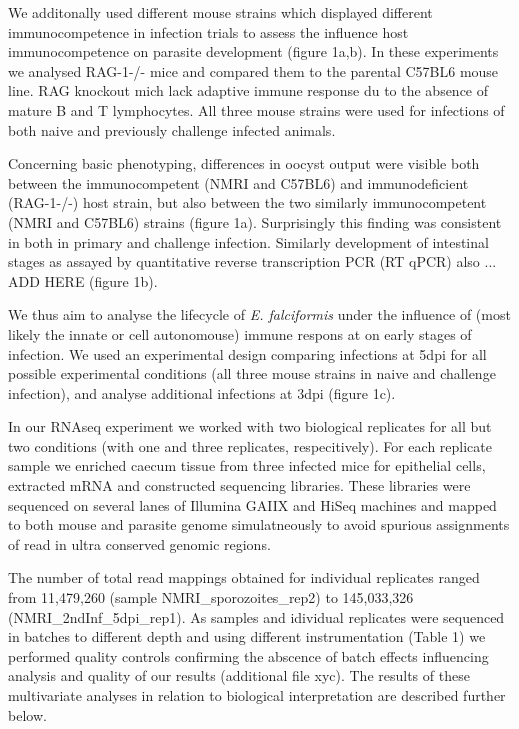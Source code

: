 \documentclass{bmcart}
\begin{document}
We additonally used different mouse strains which displayed different
immunocompetence in infection trials to assess the influence host
immunocompetence on parasite development (figure 1a,b). In these
experiments we analysed RAG-1-/- mice and compared them to the
parental C57BL6 mouse line. RAG knockout mich lack adaptive immune
response du to the absence of mature B and T lymphocytes.  All three
mouse strains were used for infections of both naive and previously
challenge infected animals.

Concerning basic phenotyping, differences in oocyst output were
visible both between the immunocompetent (NMRI and C57BL6) and
immunodeficient (RAG-1-/-) host strain, but also between the two
similarly immunocompetent (NMRI and C57BL6) strains (figure
1a). Surprisingly this finding was consistent in both in primary and
challenge infection. Similarly development of intestinal stages as
assayed by quantitative reverse transcription PCR (RT qPCR) also
... ADD HERE (figure 1b).

We thus aim to analyse the lifecycle of \textit{E. falciformis} under
the influence of (most likely the innate or cell autonomouse) immune
respons at on early stages of infection. We used an experimental
design comparing infections at 5dpi for all possible experimental
conditions (all three mouse strains in naive and challenge infection),
and analyse additional infections at 3dpi (figure 1c).

In our RNAseq experiment we worked with two biological replicates for
all but two conditions (with one and three replicates,
respecitively). For each replicate sample we enriched caecum tissue
from three infected mice for epithelial cells, extracted mRNA and
constructed sequencing libraries. These libraries were sequenced on
several lanes of Illumina GAIIX and HiSeq machines and mapped to both
mouse and parasite genome simulatneously to avoid spurious assignments
of read in ultra conserved genomic regions.

The number of total read mappings obtained for individual replicates
ranged from 11,479,260 (sample NMRI\_sporozoites\_rep2) to 145,033,326
(NMRI\_2ndInf\_5dpi\_rep1). As samples and idividual replicates were
sequenced in batches to different depth and using different
instrumentation (Table 1) we performed quality controls confirming the
abscence of batch effects influencing analysis and quality of our
results (additional file xyc). The results of these multivariate
analyses in relation to biological interpretation are described
further below.
\end{document}
